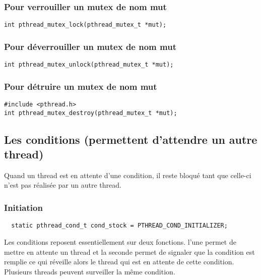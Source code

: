 \documentclass[a4paper]{article}
\begin{document}
\subsubsection{Pour verrouiller un mutex de nom mut}
\begin{lstlisting}
int pthread_mutex_lock(pthread_mutex_t *mut);
\end{lstlisting}


\subsubsection{Pour déverrouiller un mutex de nom mut}
\begin{lstlisting}
int pthread_mutex_unlock(pthread_mutex_t *mut);
\end{lstlisting}
\subsubsection{Pour détruire un mutex de nom mut}
\begin{lstlisting}
#include <pthread.h>
int pthread_mutex_destroy(pthread_mutex_t *mut);
\end{lstlisting}
\subsection{Les conditions (permettent d'attendre un autre thread)}
Quand un thread est en attente d'une condition, il reste bloqué tant que celle-ci n'est pas réalisée par un autre thread.
\subsubsection{Initiation} %
\begin{lstlisting}
  static pthread_cond_t cond_stock = PTHREAD_COND_INITIALIZER;
\end{lstlisting}
Les conditions reposent essentiellement sur deux fonctions.
l'une permet de mettre en attente un thread et la seconde permet de signaler que la condition est remplie ce qui réveille alors le thread qui est en attente de cette condition.
Plusieurs threads peuvent surveiller la même condition.
\newpage
\end{document}
